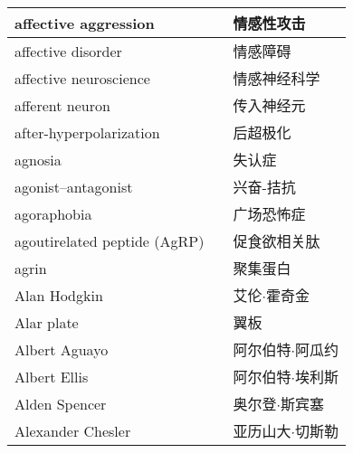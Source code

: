 \begin{longtable}{lll}
	\midrule
	affective aggression     &&  情感性攻击  \\
	
	\midrule
	affective disorder     &&  情感障碍  \\
	
	\midrule
	affective neuroscience     &&  情感神经科学  \\
	
	\midrule
	afferent neuron     &&  传入神经元  \\
	
	\midrule
	after-hyperpolarization     &&  后超极化  \\
	
	\midrule
	agnosia     &&  失认症  \\
	
	\midrule
	agonist–antagonist     &&  兴奋-拮抗  \\
	
	\midrule
	agoraphobia     &&  广场恐怖症  \\
	
	\midrule
	agoutirelated peptide (AgRP)    &&  促食欲相关肽  \\
	
	\midrule
	agrin     &&  聚集蛋白  \\
	
	\midrule
	Alan Hodgkin    &&  艾伦$\cdot$霍奇金  \\
	
	\midrule
	Alar plate     &&  翼板  \\
	
	\midrule
	Albert Aguayo     &&  阿尔伯特$\cdot$阿瓜约  \\
	
	\midrule
	Albert Ellis     &&  阿尔伯特$\cdot$埃利斯  \\
	
	\midrule
	Alden Spencer     &&  奥尔登$\cdot$斯宾塞  \\
	
	\midrule
	Alexander Chesler     &&  亚历山大$\cdot$切斯勒  \\
	

\end{longtable}
